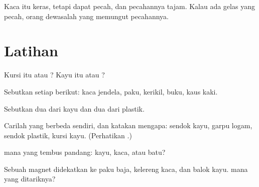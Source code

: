 \begin{remark}\label{rem:g1:materials-around-us:glass}
Kaca itu keras, tetapi dapat pecah, dan pecahannya tajam. Kalau ada
gelas yang pecah, orang dewasalah yang memungut pecahannya.
\end{remark}

\section{Latihan}

\begin{exercise}[$\star$]\label{exo:g1:materials-around-us:1}
Kursi itu  atau ? Kayu itu  atau ?
\end{exercise}

\begin{exercise}[$\star$]\label{exo:g1:materials-around-us:2}
Sebutkan  setiap  berikut: kaca jendela, paku, kerikil,
buku, kaus kaki.
\end{exercise}

\begin{exercise}[$\star$]\label{exo:g1:materials-around-us:3}
Sebutkan dua  dari kayu dan dua  dari plastik.
\end{exercise}

\begin{exercise}[$\star$]\label{exo:g1:materials-around-us:4}
Carilah yang berbeda sendiri, dan katakan mengapa: sendok kayu, garpu
logam, sendok plastik, kursi kayu. (Perhatikan .)
\end{exercise}

\begin{exercise}[$\star$]\label{exo:g1:materials-around-us:5}
 mana yang tembus pandang: kayu, kaca, atau batu?
\end{exercise}

\begin{exercise}[$\star$]\label{exo:g1:materials-around-us:6}
Sebuah magnet didekatkan ke paku baja, kelereng kaca, dan balok kayu.
 mana yang ditariknya?
\end{exercise}

